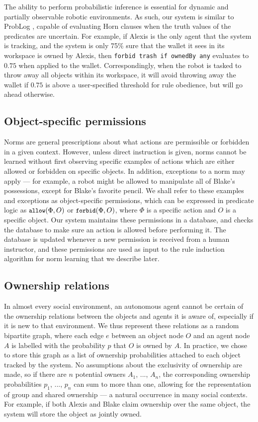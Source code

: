 \documentclass[letterpaper]{article} %
\begin{document}
The ability to perform probabilistic inference is essential for dynamic and partially observable robotic environments. As such, our system is similar to ProbLog \cite{de2007problog,de2010probabilistic}, capable of evaluating Horn clauses when the truth values of the predicates are uncertain. For example, if Alexis is the only agent that the system is tracking, and the system is only 75\% sure that the wallet it sees in its workspace is owned by Alexis, then \texttt{\small{forbid trash if ownedBy any}} evaluates to $0.75$ when applied to the wallet. Correspondingly, when the robot is tasked to throw away all objects within its workspace, it will avoid throwing away the wallet if $0.75$ is above a user-specified threshold for rule obedience, but will go ahead otherwise.

\subsection{Object-specific permissions}

Norms are general prescriptions about what actions are permissible or forbidden in a given context. However, unless direct instruction is given, norms cannot be learned without first observing specific examples of actions which are either allowed or forbidden on specific objects. In addition, exceptions to a norm may apply --- for example, a robot might be allowed to manipulate all of Blake's possessions, except for Blake's favorite pencil. We shall refer to these examples and exceptions as object-specific permissions, which can be expressed in predicate logic as $\small\texttt{allow}(\Phi, O)$ or $\small\texttt{forbid}(\Phi, O)$, where $\Phi$ is a specific action and $O$ is a specific object. Our system maintains these permissions in a database, and checks the database to make sure an action is allowed before performing it. The database is updated whenever a new permission is received from a human instructor, and these permissions are used as input to the rule induction algorithm for norm learning that we describe later.

\subsection{Ownership relations}

In almost every social environment, an autonomous agent cannot be certain of the ownership relations between the objects and agents it is aware of, especially if it is new to that environment. We thus represent these relations as a random bipartite graph, where each edge $e$ between an object node $O$ and an agent node $A$ is labelled with the probability $p$ that $O$ is owned by $A$. In practice, we chose to store this graph as a list of ownership probabilities attached to each object tracked by the system. No assumptions about the exclusivity of ownership are made, so if there are $n$ potential owners $A_1$, ..., $A_n$, the corresponding ownership probabilities $p_1$, ..., $p_n$ can sum to more than one, allowing for the representation of group and shared ownership --- a natural occurrence in many social contexts. For example, if both Alexis and Blake claim ownership over the same object, the system will store the object  as jointly owned.
\end{document}
